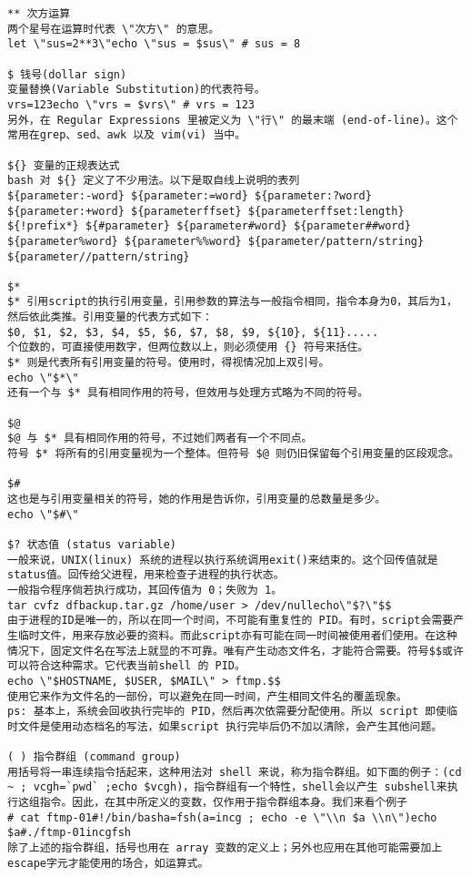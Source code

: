 \begin{lstlisting}
** 次方运算
两个星号在运算时代表 \"次方\" 的意思。
let \"sus=2**3\"echo \"sus = $sus\" # sus = 8

$ 钱号(dollar sign)
变量替换(Variable Substitution)的代表符号。
vrs=123echo \"vrs = $vrs\" # vrs = 123
另外，在 Regular Expressions 里被定义为 \"行\" 的最末端 (end-of-line)。这个常用在grep、sed、awk 以及 vim(vi) 当中。

${} 变量的正规表达式
bash 对 ${} 定义了不少用法。以下是取自线上说明的表列
${parameter:-word} ${parameter:=word} ${parameter:?word} ${parameter:+word} ${parameterffset} ${parameterffset:length} ${!prefix*} ${#parameter} ${parameter#word} ${parameter##word} ${parameter%word} ${parameter%%word} ${parameter/pattern/string} ${parameter//pattern/string}

$*
$* 引用script的执行引用变量，引用参数的算法与一般指令相同，指令本身为0，其后为1，然后依此类推。引用变量的代表方式如下：
$0, $1, $2, $3, $4, $5, $6, $7, $8, $9, ${10}, ${11}.....
个位数的，可直接使用数字，但两位数以上，则必须使用 {} 符号来括住。
$* 则是代表所有引用变量的符号。使用时，得视情况加上双引号。
echo \"$*\"
还有一个与 $* 具有相同作用的符号，但效用与处理方式略为不同的符号。

$@
$@ 与 $* 具有相同作用的符号，不过她们两者有一个不同点。
符号 $* 将所有的引用变量视为一个整体。但符号 $@ 则仍旧保留每个引用变量的区段观念。

$#
这也是与引用变量相关的符号，她的作用是告诉你，引用变量的总数量是多少。
echo \"$#\"

$? 状态值 (status variable)
一般来说，UNIX(linux) 系统的进程以执行系统调用exit()来结束的。这个回传值就是status值。回传给父进程，用来检查子进程的执行状态。
一般指令程序倘若执行成功，其回传值为 0；失败为 1。
tar cvfz dfbackup.tar.gz /home/user > /dev/nullecho\"$?\"$$
由于进程的ID是唯一的，所以在同一个时间，不可能有重复性的 PID。有时，script会需要产生临时文件，用来存放必要的资料。而此script亦有可能在同一时间被使用者们使用。在这种情况下，固定文件名在写法上就显的不可靠。唯有产生动态文件名，才能符合需要。符号$$或许可以符合这种需求。它代表当前shell 的 PID。
echo \"$HOSTNAME, $USER, $MAIL\" > ftmp.$$
使用它来作为文件名的一部份，可以避免在同一时间，产生相同文件名的覆盖现象。
ps: 基本上，系统会回收执行完毕的 PID，然后再次依需要分配使用。所以 script 即使临时文件是使用动态档名的写法，如果script 执行完毕后仍不加以清除，会产生其他问题。

( ) 指令群组 (command group)
用括号将一串连续指令括起来，这种用法对 shell 来说，称为指令群组。如下面的例子：(cd ~ ; vcgh=`pwd` ;echo $vcgh)，指令群组有一个特性，shell会以产生 subshell来执行这组指令。因此，在其中所定义的变数，仅作用于指令群组本身。我们来看个例子
# cat ftmp-01#!/bin/basha=fsh(a=incg ; echo -e \"\\n $a \\n\")echo $a#./ftmp-01incgfsh
除了上述的指令群组，括号也用在 array 变数的定义上；另外也应用在其他可能需要加上escape字元才能使用的场合，如运算式。


\end{lstlisting}

